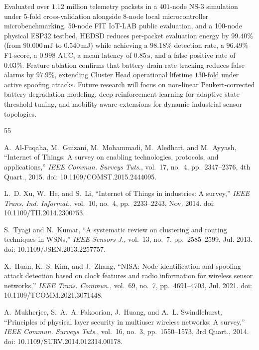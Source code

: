 \documentclass[conference]{IEEEtran}
\begin{document}
\begin{enumerate}
Evaluated over $1.12$ million telemetry packets in a $401$-node NS-3 simulation under 5-fold cross-validation alongside 8-node local microcontroller microbenchmarking, 50-node FIT IoT-LAB public evaluation, and a 100-node physical ESP32 testbed, HEDSD reduces per-packet evaluation energy by $99.40\%$ (from $90.000\,\text{mJ}$ to $0.540\,\text{mJ}$) while achieving a $98.18\%$ detection rate, a $96.49\%$ F1-score, a $0.998$ AUC, a mean latency of $0.85\,\text{s}$, and a false positive rate of $0.03\%$. Feature ablation confirms that battery drain rate tracking reduces false alarms by $97.9\%$, extending Cluster Head operational lifetime $130$-fold under active spoofing attacks. Future research will focus on non-linear Peukert-corrected battery degradation modeling, deep reinforcement learning for adaptive state-threshold tuning, and mobility-aware extensions for dynamic industrial sensor topologies.

\begin{thebibliography}{55}

A.~Al-Fuqaha, M.~Guizani, M.~Mohammadi, M.~Aledhari, and M.~Ayyash, ``Internet of Things: A survey on enabling technologies, protocols, and applications,'' \textit{IEEE Commun. Surveys Tuts.}, vol.~17, no.~4, pp.~2347--2376, 4th Quart., 2015. doi: 10.1109/COMST.2015.2444095.

L.~D. Xu, W.~He, and S.~Li, ``Internet of Things in industries: A survey,'' \textit{IEEE Trans. Ind. Informat.}, vol.~10, no.~4, pp.~2233--2243, Nov. 2014. doi: 10.1109/TII.2014.2300753.

S.~Tyagi and N.~Kumar, ``A systematic review on clustering and routing techniques in WSNs,'' \textit{IEEE Sensors J.}, vol.~13, no.~7, pp.~2585--2599, Jul. 2013. doi: 10.1109/JSEN.2013.2257757.

X.~Huan, K.~S. Kim, and J.~Zhang, ``NISA: Node identification and spoofing attack detection based on clock features and radio information for wireless sensor networks,'' \textit{IEEE Trans. Commun.}, vol.~69, no.~7, pp.~4691--4703, Jul. 2021. doi: 10.1109/TCOMM.2021.3071448.

A.~Mukherjee, S.~A.~A. Fakoorian, J.~Huang, and A.~L. Swindlehurst, ``Principles of physical layer security in multiuser wireless networks: A survey,'' \textit{IEEE Commun. Surveys Tuts.}, vol.~16, no.~3, pp.~1550--1573, 3rd Quart., 2014. doi: 10.1109/SURV.2014.012314.00178.


\end{thebibliography}
\end{enumerate}
\end{document}
